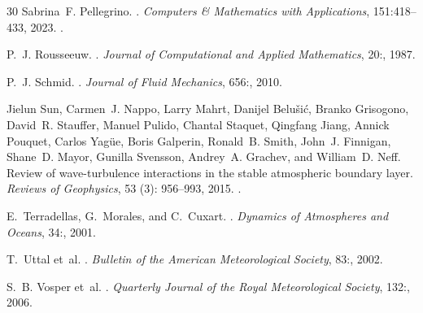 \documentclass[11pt,a4paper]{article}
\begin{document}
\begin{thebibliography}{30}
Sabrina~F. Pellegrino.
.
\newblock \emph{Computers \& Mathematics with Applications}, 151:418--433, 2023.
\newblock {}.

P.~J. Rousseeuw.
.
\newblock \emph{Journal of Computational and Applied Mathematics}, 20:\protect{}, 1987.

P.~J. Schmid.
.
\newblock \emph{Journal of Fluid Mechanics}, 656:\protect{}, 2010.

Jielun Sun, Carmen~J. Nappo, Larry Mahrt, Danijel Belu\v{s}i\'{c}, Branko Grisogono, David~R. Stauffer, Manuel Pulido, Chantal Staquet, Qingfang Jiang, Annick Pouquet, Carlos Yag\"{u}e, Boris Galperin, Ronald~B. Smith, John~J. Finnigan, Shane~D. Mayor, Gunilla Svensson, Andrey~A. Grachev, and William~D. Neff.
\newblock Review of wave-turbulence interactions in the stable atmospheric boundary layer.
\newblock \emph{Reviews of Geophysics}, 53 (3): 956--993, 2015.
\newblock {}.

E.~Terradellas, G.~Morales, and C.~Cuxart.
.
\newblock \emph{Dynamics of Atmospheres and Oceans}, 34:\protect{}, 2001.

T.~Uttal et~al.
.
\newblock \emph{Bulletin of the American Meteorological Society}, 83:\protect{}, 2002.

S.~B. Vosper et~al.
.
\newblock \emph{Quarterly Journal of the Royal Meteorological Society}, 132:\protect{}, 2006.

\end{thebibliography}
\end{document}
